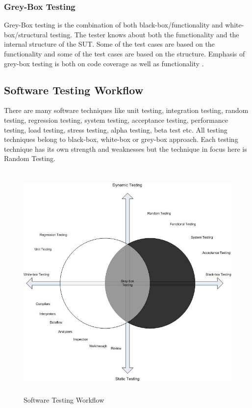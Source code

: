 \subsubsection{Grey-Box Testing}
Grey-Box testing is the combination of both black-box/functionality and white-box/structural testing. The tester knows about both the functionality and the internal structure of the SUT. Some of the test cases are based on the functionality and some of the test cases are based on the structure. Emphasis of grey-box testing is both on code coverage as well as functionality \cite{Savenkov2008}.

\subsection{Software Testing Workflow}
There are many software techniques like unit testing, integration testing, random testing, regression testing, system testing, acceptance testing, performance testing, load testing, stress testing, alpha testing, beta test etc. All testing techniques belong to black-box, white-box or grey-box approach. Each testing technique has its own strength and weaknesses but the technique in focus here is Random Testing.


\begin{figure}[h]
\begin{center}
	\includegraphics[width=16cm, height=12cm ]{Literature/Drawing34.jpg}
	\caption{Software Testing Workflow}
\end{center}  
\end{figure}


